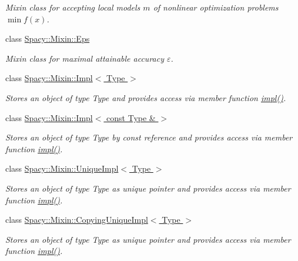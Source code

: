 \begin{DoxyCompactItemize}
\begin{DoxyCompactList}\small\item\em Mixin class for accepting local models $m$ of nonlinear optimization problems $\min f(x)$. \end{DoxyCompactList}\item 
class \hyperlink{classSpacy_1_1Mixin_1_1Eps}{Spacy\+::\+Mixin\+::\+Eps}
\begin{DoxyCompactList}\small\item\em Mixin class for maximal attainable accuracy $\varepsilon$. \end{DoxyCompactList}\item 
class \hyperlink{classSpacy_1_1Mixin_1_1Impl}{Spacy\+::\+Mixin\+::\+Impl$<$ Type $>$}
\begin{DoxyCompactList}\small\item\em Stores an object of type Type and provides access via member function \hyperlink{classSpacy_1_1Mixin_1_1Impl_a5e61399bae41338a87e701b24b13f52a}{impl()}. \end{DoxyCompactList}\item 
class \hyperlink{classSpacy_1_1Mixin_1_1Impl_3_01const_01Type_01_6_01_4}{Spacy\+::\+Mixin\+::\+Impl$<$ const Type \& $>$}
\begin{DoxyCompactList}\small\item\em Stores an object of type Type by const reference and provides access via member function \hyperlink{classSpacy_1_1Mixin_1_1Impl_3_01const_01Type_01_6_01_4_a5999a2a31217f4d4e5a0354f0bd14f66}{impl()}. \end{DoxyCompactList}\item 
class \hyperlink{classSpacy_1_1Mixin_1_1UniqueImpl}{Spacy\+::\+Mixin\+::\+Unique\+Impl$<$ Type $>$}
\begin{DoxyCompactList}\small\item\em Stores an object of type Type as unique pointer and provides access via member function \hyperlink{classSpacy_1_1Mixin_1_1UniqueImpl_ae183ae8b045db161111f761a32703547}{impl()}. \end{DoxyCompactList}\item 
class \hyperlink{classSpacy_1_1Mixin_1_1CopyingUniqueImpl}{Spacy\+::\+Mixin\+::\+Copying\+Unique\+Impl$<$ Type $>$}
\begin{DoxyCompactList}\small\item\em Stores an object of type Type as unique pointer and provides access via member function \hyperlink{classSpacy_1_1Mixin_1_1CopyingUniqueImpl_ab7cc202fd000ba1753ef8596c09dc803}{impl()}. \end{DoxyCompactList}\item 

\end{DoxyCompactItemize}
